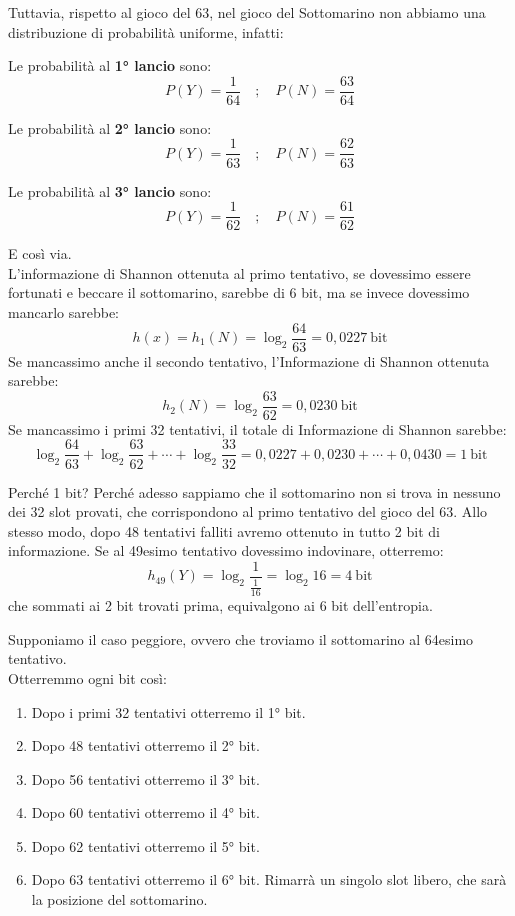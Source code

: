 Tuttavia, rispetto al gioco del 63, nel gioco del Sottomarino non abbiamo una distribuzione di probabilità uniforme, infatti:

\begin{minipage}{0.33\textwidth}
	\begin{center}
		Le probabilità al \textbf{1° lancio} sono:
		$$
		P(Y) = \frac{1}{64} \quad;\quad P(N) = \frac{63}{64}
		$$
	\end{center}
\end{minipage}
\begin{minipage}{0.33\textwidth}
	\begin{center}
		Le probabilità al \textbf{2° lancio} sono:
		$$
		P(Y) = \frac{1}{63} \quad;\quad P(N) = \frac{62}{63}
		$$
	\end{center}
\end{minipage}
\begin{minipage}{0.33\textwidth}
	\begin{center}
		Le probabilità al \textbf{3° lancio} sono:
		$$
		P(Y) = \frac{1}{62} \quad;\quad P(N) = \frac{61}{62}
		$$
	\end{center}
\end{minipage}

E così via.\\ L'informazione di Shannon ottenuta al primo tentativo, se dovessimo essere fortunati e beccare il sottomarino, sarebbe di 6 bit, ma se invece dovessimo mancarlo sarebbe:
$$
h(x) = h_1(N) = \log_{2} \frac{64}{63} = 0,0227\ \text{bit}
$$
Se mancassimo anche il secondo tentativo, l'Informazione di Shannon ottenuta sarebbe:
$$
h_2(N) = \log_{2} \frac{63}{62} = 0,0230\ \text{bit} 
$$
Se mancassimo i primi 32 tentativi, il totale di Informazione di Shannon sarebbe:
$$
\log_{2}\frac{64}{63} + \log_{2} \frac{63}{62} + \cdots + \log_{2}\frac{33}{32} = 0,0227 + 0,0230 + \cdots + 0,0430 = 1\ \text{bit}  
$$

Perché 1 bit? Perché adesso sappiamo che il sottomarino non si trova in nessuno dei 32 slot provati, che corrispondono al primo tentativo del gioco del 63. Allo stesso modo, dopo 48 tentativi falliti avremo ottenuto in tutto 2 bit di informazione. Se al 49esimo tentativo dovessimo indovinare, otterremo:
$$
h_49(Y) = \log_{2} \frac{1}{\frac{1}{16}} = \log_{2} 16 = 4\ \text{bit}
$$ 
che sommati ai 2 bit trovati prima, equivalgono ai 6 bit dell'entropia.

Supponiamo il caso peggiore, ovvero che troviamo il sottomarino al 64esimo tentativo.\\ Otterremmo ogni bit così:
\begin{enumerate}
	\item Dopo i primi 32 tentativi otterremo il 1° bit.
	\item Dopo 48 tentativi otterremo il 2° bit.
	\item Dopo 56 tentativi otterremo il 3° bit.
	\item Dopo 60 tentativi otterremo il 4° bit.
	\item Dopo 62 tentativi otterremo il 5° bit.
	\item Dopo 63 tentativi otterremo il 6° bit. Rimarrà un singolo slot libero, che sarà la posizione del sottomarino.
\end{enumerate}

